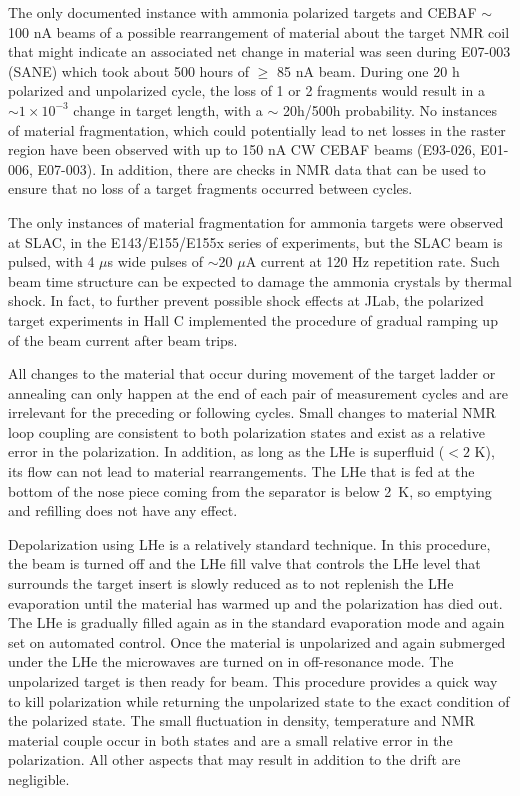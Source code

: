 The only documented instance with ammonia polarized targets and CEBAF $\sim$ 100 
nA beams of a possible rearrangement of material about the target NMR coil that
might indicate an associated net change in material was seen during E07-003 (SANE) which took about 500 hours of $\ge$ 85 nA beam. 
During one 20 h polarized and unpolarized cycle, the loss of 1 or 2 fragments 
would result in a $\sim 1\times 10^{-3}$  change in target length, with a 
$\sim$ 20h/500h probability.
No instances of material fragmentation, which could potentially lead to net 
losses in the raster region have been observed with up to 150 nA CW CEBAF beams 
(E93-026, E01-006, E07-003).  In addition, there are checks in NMR data that can be
used to ensure that no loss of a target fragments occurred between cycles. 

The only instances of material fragmentation for ammonia targets were observed 
at SLAC, in the E143/E155/E155x series of experiments, but the SLAC beam is 
pulsed, with 4 $\mu$s wide pulses of $\sim$20 $\mu$A current at 120 Hz repetition
rate. Such beam time structure can be expected to damage the ammonia crystals by
thermal shock. In fact, to further prevent possible shock effects at JLab, the 
polarized target experiments in Hall C implemented the procedure of gradual
ramping up of the beam current after beam trips.

All changes to the material that occur during movement of the target ladder or
annealing can only happen at the end of each pair of measurement cycles and are
irrelevant for the preceding or following cycles.  Small changes to material
NMR loop coupling are consistent to both polarization states and exist as
a relative error in the polarization.
In addition, as long as the LHe is superfluid ($<2$ K),
its flow can not lead to material rearrangements.  The LHe that is fed
at the bottom of the nose piece coming from the separator is below 2~K, so emptying 
and refilling does not have any effect.

Depolarization using LHe is a relatively standard technique.  In this procedure, the
beam is turned off and the LHe fill valve that controls the
LHe level that surrounds the target insert is slowly reduced as to not replenish
the LHe evaporation until the material has warmed up and the polarization has died out.
The LHe is gradually filled again as in the standard evaporation mode and again set on
automated control.  Once the material is unpolarized and again submerged under
the LHe the microwaves are turned on in off-resonance mode.  The unpolarized target
is then ready for beam.  This procedure provides a quick way to kill polarization while
returning the unpolarized state to the exact condition of the polarized state.  The
small fluctuation in density, temperature and NMR material couple occur in both states
and are a small relative error in the polarization.  All other aspects that may result
in addition to the drift are negligible. 

